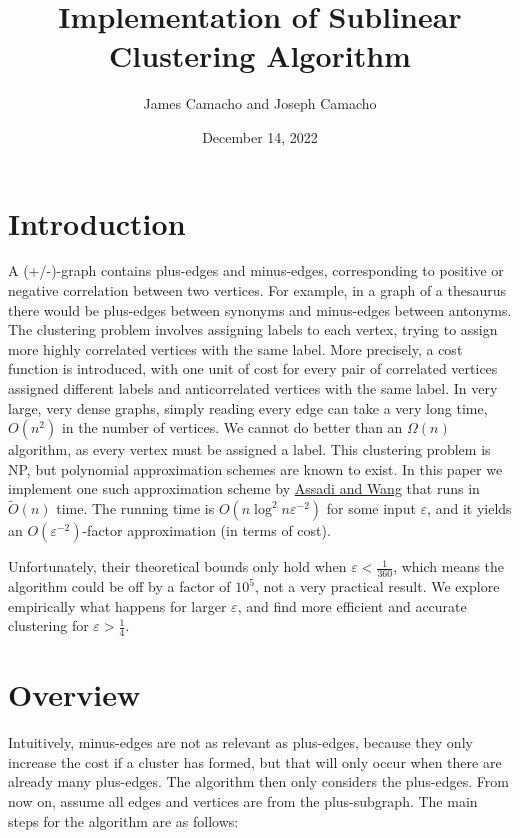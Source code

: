 \documentclass[
]{article}
\title{Implementation of Sublinear Clustering Algorithm}
\author{James Camacho and Joseph Camacho}
\date{December 14, 2022}
\begin{document}
\maketitle

\hypertarget{introduction}{%
  \section{Introduction}\label{introduction}}

A (+/-)-graph contains plus-edges and minus-edges, corresponding to positive or negative correlation between two vertices. For example, in a graph of a thesaurus there would be plus-edges between synonyms and minus-edges between antonyms. The clustering problem involves assigning labels to each vertex, trying to assign more highly correlated vertices with the same label. More precisely, a cost function is introduced, with one unit of cost for every pair of correlated vertices assigned different labels and anticorrelated vertices with the same label. In very large, very dense graphs, simply reading every edge can take a very long time, $O(n^2)$ in the number of vertices. We cannot do better than an $\Omega(n)$ algorithm, as every vertex must be assigned a label. This clustering problem is NP, but polynomial approximation schemes are known to exist. In this paper we implement one such approximation scheme by \href{https://doi.org/10.48550/arxiv.2109.14528}{Assadi and Wang} that runs in $\tilde{O}(n)$ time. The running time is $O(n\log^2 n\varepsilon^{-2})$ for some input $\varepsilon$, and it yields an $O(\varepsilon^{-2})$-factor approximation (in terms of cost).

Unfortunately, their theoretical bounds only hold when $\varepsilon < \frac{1}{360}$, which means the algorithm could be off by a factor of $10^5$, not a very practical result. We explore empirically what happens for larger $\varepsilon$, and find more efficient and accurate clustering for $\varepsilon > \frac14$.

\hypertarget{overview}{%
  \section{Overview}\label{overview}}

Intuitively, minus-edges are not as relevant as plus-edges, because they only increase the cost if a cluster has formed, but that will only occur when there are already many plus-edges. The algorithm then only considers the plus-edges. From now on, assume all edges and vertices are from the plus-subgraph. The main steps for the algorithm are as follows:
\end{document}
